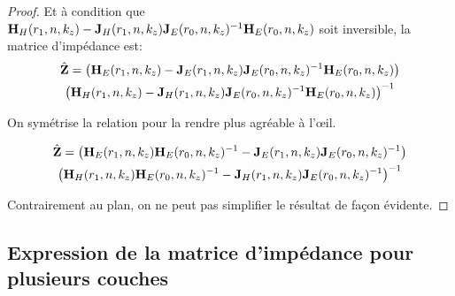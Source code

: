 \begin{proof}
      Et à condition que \(\mH_{H}(r_1,n,k_z) - \mJ_{H}(r_1,n,k_z)\mJ_{E}(r_0,n,k_z)^{-1}\mH_{E}(r_0,n,k_z)\) soit inversible, la matrice d'impédance est:
      \begin{multline}
        \hat \mZ =
        \left(\mH_{E}(r_1,n,k_z) - \mJ_{E}(r_1,n,k_z)\mJ_{E}(r_0,n,k_z)^{-1}\mH_{E}(r_0,n,k_z)\right)
        \\
        \left(\mH_{H}(r_1,n,k_z) - \mJ_{H}(r_1,n,k_z)\mJ_{E}(r_0,n,k_z)^{-1}\mH_{E}(r_0,n,k_z)\right)^{-1}
      \end{multline}

      On symétrise la relation pour la rendre plus agréable à l’œil.

      \begin{multline}
        \hat \mZ =
        \left(\mH_{E}(r_1,n,k_z)\mH_{E}(r_0,n,k_z)^{-1} - \mJ_{E}(r_1,n,k_z)\mJ_{E}(r_0,n,k_z)^{-1}\right)
        \\
        \left(\mH_{H}(r_1,n,k_z)\mH_{E}(r_0,n,k_z)^{-1} - \mJ_{H}(r_1,n,k_z)\mJ_{E}(r_0,n,k_z)^{-1}\right)^{-1}
      \end{multline}

      Contrairement au plan, on ne peut pas simplifier le résultat de façon évidente.

    \end{proof}



  \subsection{Expression de la matrice d'impédance pour plusieurs couches}

    \begin{figure}[!hbt]
      \centering
      \begin{tikzpicture}
        
      \end{tikzpicture}
    \end{figure}


